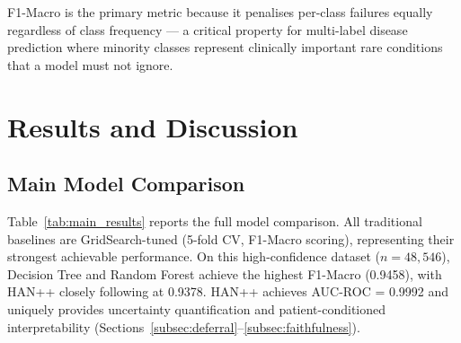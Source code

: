 \documentclass[conference]{IEEEtran}
\begin{document}
F1-Macro is the primary metric because it penalises per-class failures
equally regardless of class frequency --- a critical property for
multi-label disease prediction where minority classes represent clinically
important rare conditions that a model must not ignore.

\section{Results and Discussion}
\label{sec:results}

\subsection{Main Model Comparison}
\label{subsec:main_results}

Table~\ref{tab:main_results} reports the full model comparison.
All traditional baselines are GridSearch-tuned (5-fold CV, F1-Macro scoring),
representing their strongest achievable performance.
On this high-confidence dataset ($n = 48{,}546$), Decision Tree and
Random Forest achieve the highest F1-Macro (0.9458), with HAN++ closely
following at 0.9378.
HAN++ achieves AUC-ROC = 0.9992 and uniquely provides uncertainty
quantification and patient-conditioned interpretability
(Sections~\ref{subsec:deferral}--\ref{subsec:faithfulness}).
\end{document}

